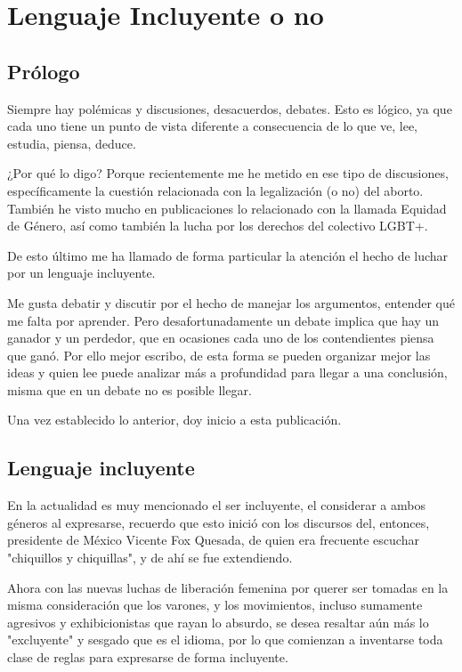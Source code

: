 \chapter{Lenguaje Incluyente o no}
\section{Prólogo}
Siempre hay polémicas y discusiones, desacuerdos, debates. Esto es lógico, ya que cada uno tiene un punto de vista diferente a consecuencia de lo que ve, lee, estudia, piensa, deduce.

¿Por qué lo digo? Porque recientemente me he metido en ese tipo de discusiones, específicamente la cuestión relacionada con la legalización (o no) del aborto. También he visto mucho en publicaciones lo relacionado con la llamada Equidad de Género, así como también la lucha por los derechos del colectivo LGBT+.

De esto último me ha llamado de forma particular la atención el hecho de luchar por un lenguaje incluyente.

Me gusta debatir y discutir por el hecho de manejar los argumentos, entender qué me falta por aprender. Pero desafortunadamente un debate implica que hay un ganador y un perdedor, que en ocasiones cada uno de los contendientes piensa que ganó. Por ello mejor escribo, de esta forma se pueden organizar mejor las ideas y quien lee puede analizar más a profundidad para llegar a una conclusión, misma que en un debate no es posible llegar.

Una vez establecido lo anterior, doy inicio a esta publicación.

\section{Lenguaje incluyente}
En la actualidad es muy mencionado el ser incluyente, el considerar a ambos géneros al expresarse, recuerdo que esto inició con los discursos del, entonces, presidente de México Vicente Fox Quesada, de quien era frecuente escuchar "chiquillos y chiquillas", y de ahí se fue extendiendo.

Ahora con las nuevas luchas de liberación femenina por querer ser tomadas en la misma consideración que los varones, y los movimientos, incluso sumamente agresivos y exhibicionistas que rayan lo absurdo, se desea resaltar aún más lo "excluyente" y sesgado que es el idioma, por lo que comienzan a inventarse toda clase de reglas para expresarse de forma incluyente.

